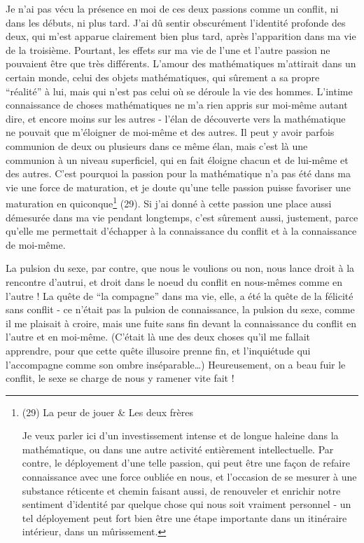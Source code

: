 Je n'ai pas vécu la présence en moi de ces deux passions comme un conflit, ni dans les débuts, ni plus tard. J'ai dû sentir obscurément l'identité profonde des deux, qui m'est apparue clairement bien plus tard, après l'apparition dans ma vie de la troisième. Pourtant, les effets sur ma vie de l'une et l'autre passion ne pouvaient être que très différents. L'amour des mathématiques m'attirait dans un certain monde, celui des objets mathématiques, qui sûrement a sa propre ``réalité'' à lui, mais qui n'est pas celui où se déroule la vie des hommes. L'intime connaissance de choses mathématiques ne m'a rien appris sur moi-même autant dire, et encore moins sur les autres - l'élan de découverte vers la mathématique ne pouvait que m'éloigner de moi-même et des autres. Il peut y avoir parfois communion de deux ou plusieurs dans ce même élan, mais c'est là une communion à un niveau superficiel, qui en fait éloigne chacun et de lui-même et des autres. C'est pourquoi la passion pour la mathématique n'a pas été dans ma vie une force de maturation, et je doute qu'une telle passion puisse favoriser une maturation en quiconque\footnote{(29) La peur de jouer \& Les deux frères

Je veux parler ici d'un investissement intense et de longue haleine dans la mathématique, ou dans une autre activité entièrement intellectuelle. Par contre, le déployement d'une telle passion, qui peut être une façon de refaire connaissance avec une force oubliée en nous, et l'occasion de se mesurer à une substance réticente et chemin faisant aussi, de renouveler et enrichir notre sentiment d'identité par quelque chose qui nous soit vraiment personnel - un tel déployement peut fort bien être une étape importante dans un itinéraire intérieur, dans un mûrissement.} (29). Si j'ai donné à cette passion une place aussi démesurée dans ma vie pendant longtemps, c'est sûrement aussi, justement, parce qu'elle me permettait d'échapper à la connaissance du conflit et à la connaissance de moi-même.

La pulsion du sexe, par contre, que nous le voulions ou non, nous lance droit à la rencontre d'autrui, et droit dans le noeud du conflit en nous-mêmes comme en l'autre ! La quête de ``la compagne'' dans ma vie, elle, a été la quête de la félicité sans conflit - ce n'était pas la pulsion de connaissance, la pulsion du sexe, comme il me plaisait à croire, mais une fuite sans fin devant la connaissance du conflit en l'autre et en moi-même. (C'était là une des deux choses qu'il me fallait apprendre, pour que cette quête illusoire prenne fin, et l'inquiétude qui l'accompagne comme son ombre inséparable\ldots) Heureusement, on a beau fuir le conflit, le sexe se charge de nous y ramener vite fait !

